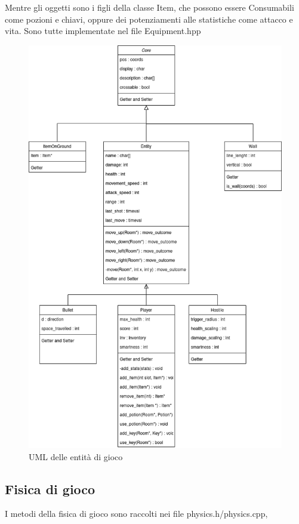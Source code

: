 \documentclass{article}
\begin{document}
Mentre gli oggetti sono i figli della classe Item, che possono essere Consumabili come pozioni e chiavi, oppure dei potenziamenti alle statistiche come attacco e vita. Sono tutte implementate nel file Equipment.hpp

\begin{figure}[!ht]
    \centering
    \includegraphics[width=1\textwidth]{UML_Prog_Programmazione.png}
    \caption{UML delle entità di gioco}
    \label{fig:1}
\end{figure}
\FloatBarrier

\subsection{Fisica di gioco}
I metodi della fisica di gioco sono raccolti nei file physics.h/physics.cpp, %
\end{document}
